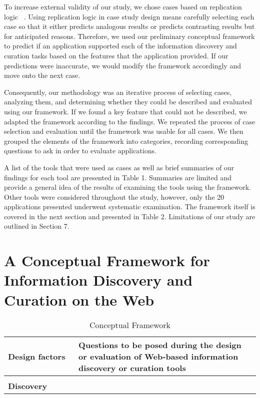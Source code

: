 \documentclass{casconpaper}
\begin{document}
{{To increase external validity of our study, we chose cases based on replication logic ~\cite{yin}. Using replication logic in case study design means carefully selecting each case so that it either predicts analogous results or predicts contrasting results but for anticipated reasons. Therefore, we used our preliminary conceptual framework to predict if an application supported each of the information discovery and curation tasks based on the features that the application provided. If our predictions were inaccurate, we would modify the framework accordingly and move onto the next case. 

Consequently, our methodology was an iterative process of selecting cases, analyzing them, and determining whether they could be described and evaluated using our framework. If we found a key feature that could not be described, we adapted the framework according to the findings. We repeated the process of case selection and evaluation until the framework was usable for all cases. We then grouped the elements of the framework into categories, recording corresponding questions to ask in order to evaluate applications. 

A list of the tools that were used as cases as well as brief summaries of our findings for each tool are presented in Table 1. Summaries are limited and provide a general idea of the results of examining the tools using the framework. Other tools were considered throughout the study, however, only the 20 applications presented underwent systematic examination. The framework itself is covered in the next section and presented in Table 2. Limitations of our study are outlined in Section 7.

} %

{\section{A Conceptual Framework for Information Discovery and Curation on the Web}
\begin{table*}[htbp]
\caption{Conceptual Framework}
\centering
\small
\begin{tabular}{|p{0.28\linewidth}|p{0.72\linewidth}|}
\hline
\textbf{\large{Design factors}}   & \textbf{\large{Questions to be posed during the design or evaluation of Web-based information discovery or curation tools 
}}  \\
\hline
&\\
\textbf{\large{Discovery}}                     &                                                                                                           \\


\end{tabular}
\end{table*}}}
\end{document}
